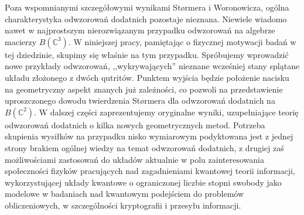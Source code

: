Poza wspomnianymi szczegółowymi wynikami St{\o}rmera i Woronowicza,
ogólna charakterystyka odwzorowań dodatnich pozostaje nieznana.
Niewiele wiadomo nawet w najprostszym nierozwiązanym przypadku odwzorowań
na algebrze macierzy $B(\mathbb{C}^{3})$.
W niniejszej pracy,
pamiętając o fizycznej motywacji badań w tej dziedzinie,
skupimy się właśnie na tym przypadku.
Spróbujemy wprowadzić nowe przykłady odwzorowań,
,,wykrywających'' nieznane wcześniej stany splątane układu złożonego
z dwóch qutritów.
Punktem wyjścia będzie położenie nacisku na geometryczny aspekt znanych
już zależności,
co pozwoli na przedstawienie uproszczonego dowodu twierdzenia St{\o}rmera
dla odwzorowań dodatnich na $B(\mathbb{C}^{2})$.
W dalszej części zaprezentujemy oryginalne wyniki,
uzupełniające teorię odwzorowań dodatnich o kilka nowych geometrycznych metod.
Potrzeba skupienia wysiłków na przypadku nisko wymiarowym podyktowana jest
z jednej strony brakiem ogólnej wiedzy na temat odwzorowań dodatnich,
z drugiej zaś możliwościami zastosowań do układów aktualnie w polu zainteresowania
społeczności fizyków pracujących nad zagadnieniami kwantowej teorii informacji,
wykorzystującej układy kwantowe o ograniczonej liczbie stopni swobody
jako modelowe w badaniach nad kwantowym podejściem do problemów obliczeniowych,
w szczególności kryptografii i przesyłu informacji.

